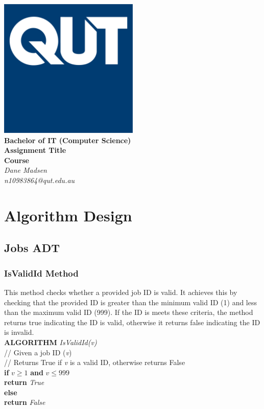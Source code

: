 \documentclass[12pt,a4paper]{article}
\begin{document}
	\begin{titlepage}
		
		\begin{center}
			\includegraphics[width=0.5\textwidth]{QUT.jpg}\\
			[0.03\textheight]  
			\Large\textbf{Bachelor of IT (Computer Science)}\\
			\Large\textbf{Assignment Title}\\
			\large\textbf{Course}\\
			[0.02\textheight]
			\large\textsl{Dane Madsen}\\
			\large\textsl{n10983864@qut.edu.au}
		\end{center}
		
	\end{titlepage}
	\tableofcontents
	\newpage
	
	\section{Algorithm Design}
		\subsection{Jobs ADT}
			\subsubsection{IsValidId Method}
				This method checks whether a provided job ID is valid. It achieves this 
				by checking that the provided ID is greater than the minimum valid ID (1) and 
				less than the maximum valid ID (999). If the ID is meets these criteria, the 
				method returns true indicating the ID is valid, otherwise it returns false 
				indicating the ID is invalid.\\
				
				\textbf{ALGORITHM} \textit{IsValidId(v)}\\
				\null\qquad\quad// Given a job ID (\textit{v})\\
				\null\qquad\quad// Returns True if \textit{v} is a valid ID, otherwise returns False\\
				\null\qquad\quad\textbf{if} \textit{$v \geq 1$} \textbf{and} \textit{$v \leq 999$}\\
				\null\qquad\qquad\textbf{return} \textit{True}\\
				\null\qquad\quad\textbf{else}\\
				\null\qquad\qquad\textbf{return} \textit{False}
\end{document}
